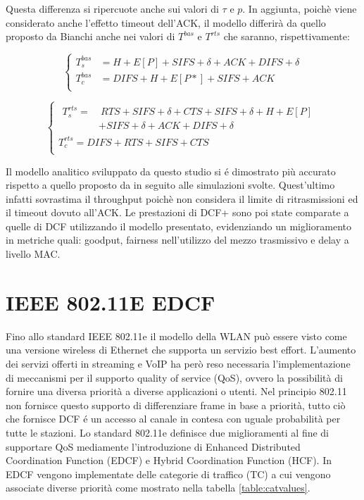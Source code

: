
Questa differenza si ripercuote anche sui valori di $\tau$ e $p$.
In aggiunta, poich\`e viene considerato anche l'effetto timeout dell'ACK, il modello differir\`a da quello proposto da Bianchi anche nei valori di $T^{bas}$ e $T^{rts}$ che saranno, rispettivamente:

$$
\begin{cases}
T_{s}^{bas} &= H + E[P] + SIFS + \delta + ACK + DIFS + \delta \\
T_{c}^{bas} &= DIFS + H + E[P*] + SIFS + ACK \\
\end{cases}
$$

$$
\begin{cases}
\!\begin{aligned}
T_{s}^{rts} =  &\ RTS + SIFS + \delta + CTS + SIFS + \delta + H + E[P]  \\ & + SIFS + \delta + ACK + DIFS + \delta 
\end{aligned}
\\
T_{c}^{rts} = DIFS + RTS + SIFS + CTS \\
\end{cases}
$$

Il modello analitico sviluppato da questo studio si \'e dimostrato pi\`u accurato rispetto a quello proposto da \cite{bianchi2000performance} in seguito alle simulazioni svolte.
Quest'ultimo infatti sovrastima il throughput poich\`e non considera il limite di ritrasmissioni ed il timeout dovuto all'ACK.
Le prestazioni di DCF+ sono poi state comparate a quelle di DCF utilizzando il modello presentato, evidenziando un miglioramento in metriche quali: goodput, fairness nell'utilizzo del mezzo trasmissivo e delay a livello MAC.

\newpage
\section{IEEE 802.11E EDCF}
Fino allo standard IEEE 802.11e \cite{ieee05} il modello della WLAN pu\`o essere visto come una versione wireless di Ethernet che supporta un servizio best effort.
L'aumento dei servizi offerti in streaming e VoIP ha per\`o reso necessaria l'implementazione di meccanismi per il supporto quality of service (QoS), ovvero la possibilit\`a di fornire una diversa priorit\`a a diverse applicazioni o utenti.
Nel principio 802.11 non fornisce questo supporto di differenziare frame in base a priorit\`a, tutto ci\`o che fornisce DCF \'e un accesso al canale in contesa con uguale probabilit\`a per tutte le stazioni.
Lo standard 802.11e definisce due miglioramenti al fine di supportare QoS mediamente l'introduzione di Enhanced Distributed Coordination Function (EDCF) e Hybrid Coordination Function (HCF).
In EDCF vengono implementate delle categorie di traffico (TC) a cui vengono associate diverse priorit\`a come mostrato nella tabella \ref{table:catvalues}.

